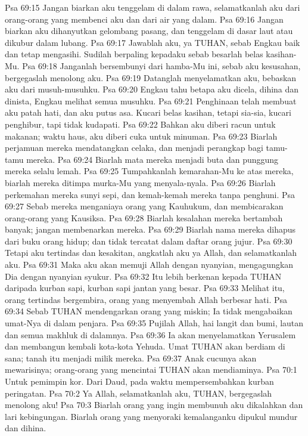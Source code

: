 Psa 69:15  Jangan biarkan aku tenggelam di dalam rawa, selamatkanlah aku dari orang-orang yang membenci aku dan dari air yang dalam.
Psa 69:16  Jangan biarkan aku dihanyutkan gelombang pasang, dan tenggelam di dasar laut atau dikubur dalam lubang.
Psa 69:17  Jawablah aku, ya TUHAN, sebab Engkau baik dan tetap mengasihi. Sudilah berpaling kepadaku sebab besarlah belas kasihan-Mu.
Psa 69:18  Janganlah bersembunyi dari hamba-Mu ini, sebab aku kesusahan, bergegaslah menolong aku.
Psa 69:19  Datanglah menyelamatkan aku, bebaskan aku dari musuh-musuhku.
Psa 69:20  Engkau tahu betapa aku dicela, dihina dan dinista, Engkau melihat semua musuhku.
Psa 69:21  Penghinaan telah membuat aku patah hati, dan aku putus asa. Kucari belas kasihan, tetapi sia-sia, kucari penghibur, tapi tidak kudapati.
Psa 69:22  Bahkan aku diberi racun untuk makanan; waktu haus, aku diberi cuka untuk minuman.
Psa 69:23  Biarlah perjamuan mereka mendatangkan celaka, dan menjadi perangkap bagi tamu-tamu mereka.
Psa 69:24  Biarlah mata mereka menjadi buta dan punggung mereka selalu lemah.
Psa 69:25  Tumpahkanlah kemarahan-Mu ke atas mereka, biarlah mereka ditimpa murka-Mu yang menyala-nyala.
Psa 69:26  Biarlah perkemahan mereka sunyi sepi, dan kemah-kemah mereka tanpa penghuni.
Psa 69:27  Sebab mereka menganiaya orang yang Kauhukum, dan membicarakan orang-orang yang Kausiksa.
Psa 69:28  Biarlah kesalahan mereka bertambah banyak; jangan membenarkan mereka.
Psa 69:29  Biarlah nama mereka dihapus dari buku orang hidup; dan tidak tercatat dalam daftar orang jujur.
Psa 69:30  Tetapi aku tertindas dan kesakitan, angkatlah aku ya Allah, dan selamatkanlah aku.
Psa 69:31  Maka aku akan memuji Allah dengan nyanyian, mengagungkan Dia dengan nyanyian syukur.
Psa 69:32  Itu lebih berkenan kepada TUHAN daripada kurban sapi, kurban sapi jantan yang besar.
Psa 69:33  Melihat itu, orang tertindas bergembira, orang yang menyembah Allah berbesar hati.
Psa 69:34  Sebab TUHAN mendengarkan orang yang miskin; Ia tidak mengabaikan umat-Nya di dalam penjara.
Psa 69:35  Pujilah Allah, hai langit dan bumi, lautan dan semua makhluk di dalamnya.
Psa 69:36  Ia akan menyelamatkan Yerusalem dan membangun kembali kota-kota Yehuda. Umat TUHAN akan berdiam di sana; tanah itu menjadi milik mereka.
Psa 69:37  Anak cucunya akan mewarisinya; orang-orang yang mencintai TUHAN akan mendiaminya.
Psa 70:1  Untuk pemimpin kor. Dari Daud, pada waktu mempersembahkan kurban peringatan.
Psa 70:2  Ya Allah, selamatkanlah aku, TUHAN, bergegaslah menolong aku!
Psa 70:3  Biarlah orang yang ingin membunuh aku dikalahkan dan lari kebingungan. Biarlah orang yang menyoraki kemalanganku dipukul mundur dan dihina.

